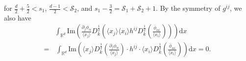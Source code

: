 \documentclass[10pt,twoside,a4paper]{article}
\numberwithin{equation}{section}\allowdisplaybreaks
\begin{document}
for $ \frac{d}{2}+\frac 52<s_1 $, $ \frac{d-1} 2<\mathscr{S}_2 $, and  $s_1-\frac 32=\mathscr{S}_1+\mathscr{S}_2+1 $.
By the symmetry of $ g^{ij} $, we also have
\begin{align*}
	& \int_{\mathbb{R}^d}\mathrm{Im} \left(   \frac{\partial_j \phi_{\alpha }  } {\langle x_j\rangle} D_k^{\frac12}\left ( \langle x_j\rangle\langle x_i\rangle h^{ij} D_k^{\frac12}   \left (\frac{\overline{\phi}_{\alpha i } } {\langle x_i\rangle}\right)\right)\right) \mathrm{d} x \\
	=&\,  \int_{\mathbb{R}^d}\mathrm{Im} \left(  \langle x_j\rangle D_k^{\frac12} \left(\frac{\partial_j \phi_{\alpha }  } {\langle x_j\rangle}\right) \cdot h^{ij} \cdot  \langle x_i\rangle D_k^{\frac12}   \left (\frac{\overline{\phi}_{\alpha i } } {\langle x_i\rangle}\right)\right)  \mathrm{d} x =0.	
	\end{align*}
\end{document}
